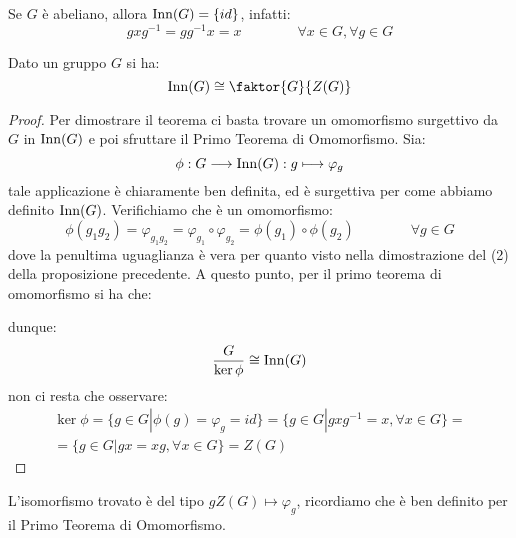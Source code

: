 \documentclass[11pt]{scrartcl}
\begin{document}
\begin{remark}
    Se $G$ è abeliano, allora $\operatorname{Inn}(G) = \{id\}$, infatti:
        \[ gxg^{-1} = gg^{-1}x = x \qquad \qquad \forall x \in G, \forall g \in G
            \]
\end{remark}

\begin{proposition}
    Dato un gruppo $G$ si ha:
    \[\Inn(G) \cong \faktor{G}{Z(G)}\]
\end{proposition}

\begin{proof}
    Per dimostrare il teorema ci basta trovare un omomorfismo surgettivo da $G$ in $\operatorname{Inn}(G)$ e poi sfruttare il Primo Teorema di Omomorfismo. Sia:
        \[ \phi : G \longrightarrow \operatorname{Inn}(G) : g \longmapsto \varphi_g
            \]
    tale applicazione è chiaramente ben definita, ed è surgettiva per come abbiamo definito $\operatorname{Inn}(G)$. Verifichiamo che è un omomorfismo:
        \[ \phi(g_1g_2) = \varphi_{g_1g_2} = \varphi_{g_1} \circ \varphi_{g_2} = \phi(g_1) \circ \phi(g_2)
        \qquad \qquad \forall g \in G
            \]
        dove la penultima uguaglianza è vera per quanto visto nella dimostrazione del (2) della proposizione precedente. A questo punto, per il 
        primo teorema di omomorfismo si ha che:
            \begin{center}
            \end{center}
        dunque:
            \[ \frac{G}{\ker{\phi}} \cong \operatorname{Inn}(G)
                \]
        non ci resta che osservare:
            \begin{multline*}
                \ker{\phi} = \{g \in G | \phi(g) = \varphi_g = id\} = \{g \in G | gxg^{-1} = x, \forall x \in G\} = \\ 
                = \{g \in G | gx = xg, \forall x \in G\} = Z(G)
            \end{multline*}
\end{proof}

\begin{remark}
    L'isomorfismo trovato è del tipo $gZ(G) \longmapsto \varphi_g$, ricordiamo che è ben definito per il Primo Teorema di Omomorfismo.
\end{remark}
\end{document}
